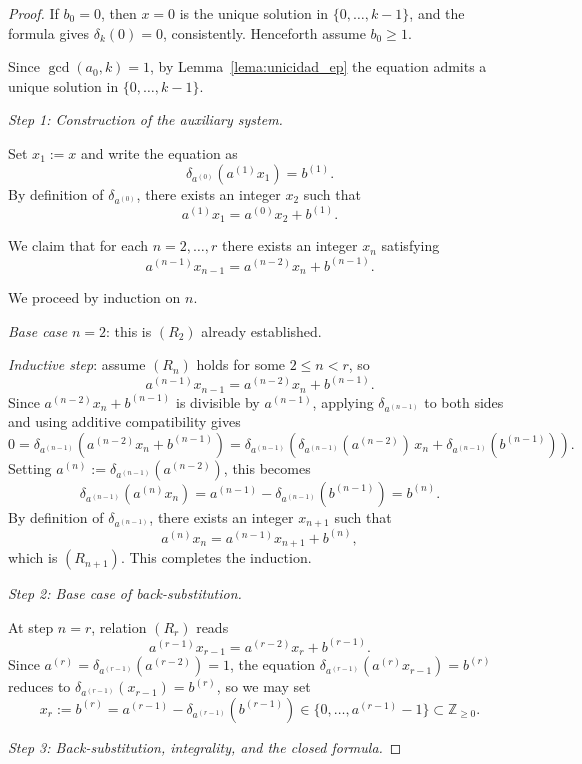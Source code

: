 \documentclass[10pt,a4paper]{amsart}
\begin{document}
\begin{proof}
If $b_0 = 0$, then $x = 0$ is the unique solution in $\{0,\dots,k-1\}$,
and the formula gives $\delta_k(0) = 0$, consistently.
Henceforth assume $b_0 \ge 1$.

Since $\gcd(a_0,k)=1$, by Lemma~\ref{lema:unicidad_ep} the equation
admits a unique solution in $\{0,\dots,k-1\}$.

\medskip
\textit{Step 1: Construction of the auxiliary system.}

Set $x_1 := x$ and write the equation as
\[
\delta_{a^{(0)}}(a^{(1)} x_1) = b^{(1)}.
\]
By definition of $\delta_{a^{(0)}}$, there exists an integer $x_2$ such
that
\[
a^{(1)} x_1 = a^{(0)} x_2 + b^{(1)}.
\tag{$R_2$}
\]

We claim that for each $n = 2, \dots, r$ there exists an integer $x_n$
satisfying
\[
a^{(n-1)} x_{n-1} = a^{(n-2)} x_n + b^{(n-1)}.
\tag{$R_n$}
\]

We proceed by induction on $n$.

\textit{Base case} $n = 2$: this is $(R_2)$ already established.

\textit{Inductive step}: assume $(R_n)$ holds for some $2 \le n < r$,
so
\[
a^{(n-1)} x_{n-1} = a^{(n-2)} x_n + b^{(n-1)}.
\]
Since $a^{(n-2)} x_n + b^{(n-1)}$ is divisible by $a^{(n-1)}$,
applying $\delta_{a^{(n-1)}}$ to both sides and using additive
compatibility gives
\[
0 = \delta_{a^{(n-1)}}\!\left(a^{(n-2)} x_n + b^{(n-1)}\right)
  = \delta_{a^{(n-1)}}\!\left(\delta_{a^{(n-1)}}(a^{(n-2)})\, x_n
    + \delta_{a^{(n-1)}}(b^{(n-1)})\right).
\]
Setting $a^{(n)} := \delta_{a^{(n-1)}}(a^{(n-2)})$, this becomes
\[
\delta_{a^{(n-1)}}(a^{(n)} x_n) = a^{(n-1)} - \delta_{a^{(n-1)}}(b^{(n-1)})
= b^{(n)}.
\]
By definition of $\delta_{a^{(n-1)}}$, there exists an integer $x_{n+1}$
such that
\[
a^{(n)} x_n = a^{(n-1)} x_{n+1} + b^{(n)},
\]
which is $(R_{n+1})$. This completes the induction.

\medskip
\textit{Step 2: Base case of back-substitution.}

At step $n = r$, relation $(R_r)$ reads
\[
a^{(r-1)} x_{r-1} = a^{(r-2)} x_r + b^{(r-1)}.
\]
Since $a^{(r)} = \delta_{a^{(r-1)}}(a^{(r-2)}) = 1$, the equation
$\delta_{a^{(r-1)}}(a^{(r)} x_{r-1}) = b^{(r)}$ reduces to
$\delta_{a^{(r-1)}}(x_{r-1}) = b^{(r)}$,
so we may set
\[
x_r := b^{(r)} = a^{(r-1)} - \delta_{a^{(r-1)}}(b^{(r-1)})
\in \{0, \dots, a^{(r-1)}-1\} \subset \mathbb{Z}_{\ge 0}.
\]

\medskip
\textit{Step 3: Back-substitution, integrality, and the closed formula.}


\end{proof}
\end{document}
